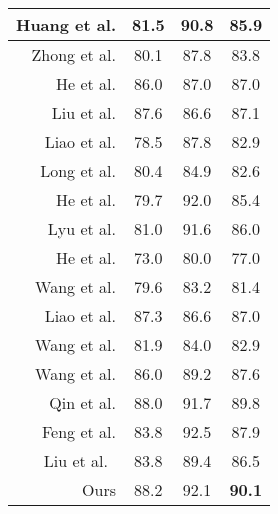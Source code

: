 \begin{table}[!t]
\begin{tabular}{ r  |ccc}
      Huang et al. \cite{huang2019mask1} & 81.5 & 90.8 & 85.9 \\
      \hline
      Zhong et al. \cite{zhong2019improved} & 80.1 & 87.8 & 83.8 \\
      \hline
      He et al. \cite{he2018end2} & 86.0 & 87.0 & 87.0 \\
      \hline
      Liu et al. \cite{liu2019arbitrarily} & 87.6 & 86.6 & 87.1 \\
      \hline
      Liao et al. \cite{liao2018textboxes++} & 78.5 & 87.8 & 82.9 \\
      \hline
      Long et al. \cite{long2018textsnake} & 80.4 & 84.9 & 82.6 \\
      \hline
      He et al. \cite{he2020realtime} & 79.7 & 92.0 & 85.4 \\
      \hline
      Lyu et al. \cite{lyu2018mask} & 81.0 & 91.6 & 86.0 \\
      \hline
      He et al. \cite{he2017single} & 73.0 & 80.0 & 77.0 \\
      \hline
      Wang et al. \cite{xie2019convolutional} & 79.6 & 83.2 & 81.4 \\
      \hline
      Liao et al. \cite{liao2019mask} & 87.3 & 86.6 & 87.0 \\
      \hline
      Wang et al. \cite{wang2019efficient} & 81.9 & 84.0 & 82.9 \\
      \hline
      Wang et al. \cite{Wang_2019_CVPR} & 86.0 & 89.2 & 87.6 \\
      \hline
      Qin et al. \cite{qin2019towards} & 88.0 & 91.7 & 89.8 \\
      \hline
      Feng et al. \cite{feng2019textdragon} & 83.8 & 92.5 & 87.9 \\
      \hline\hline
      Liu et al.\  \cite{liu2019omnidirectional} & 83.8 & 89.4 & 86.5 \\
      \hline
Ours & 88.2 & 92.1 & \bf 90.1 \\
      \hline
    \end{tabular}
   \end{table}

